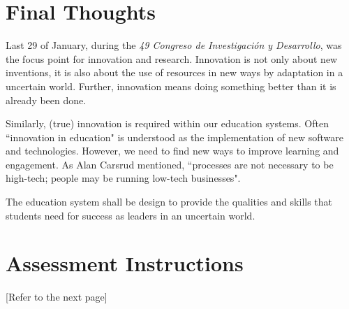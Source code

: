 \documentclass[11pt,a4paper]{article}
\begin{document}
\section{Final Thoughts}\label{sec:app}
Last 29 of January, during the \emph{49 Congreso de Investigación y Desarrollo}, was the focus point for innovation and research. Innovation is not only about new inventions, it is also about the use of resources in new ways by adaptation in a uncertain world. Further, innovation means doing something better than it is already been done.

Similarly, (true) innovation is required within our education systems. Often ``innovation in education" is understood as the implementation of new software and technologies. However, we need to find new ways to improve learning and engagement. As Alan Carsrud mentioned, ``processes are not necessary to be high-tech; people may be running low-tech businesses".

The education system shall be design to provide the qualities and skills that students need for success as leaders in an uncertain world.


\clearpage
\printbibliography

\appendix %

\section{Assessment Instructions}\label{sec:instructions}
[Refer to the next page]


\end{document}
